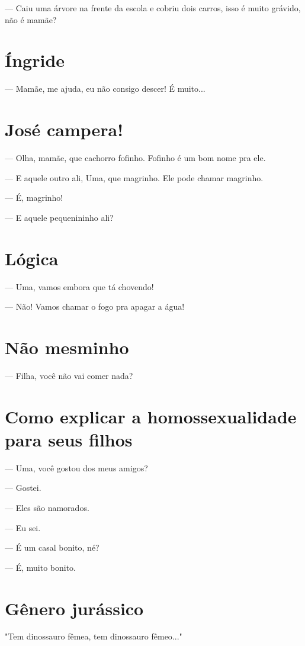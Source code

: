 — Caiu uma árvore na frente da escola e cobriu dois carros, isso é muito
grávido, não é mamãe?

\chapter{Íngride}

— Mamãe, me ajuda, eu não consigo descer! É muito...

\chapter{José campera!}

— Olha, mamãe, que cachorro fofinho. Fofinho é um bom nome pra ele.

— E aquele outro ali, Uma, que magrinho. Ele pode chamar magrinho.

— É, magrinho!

— E aquele pequenininho ali?

\chapter{Lógica}

— Uma, vamos embora que tá chovendo!

— Não! Vamos chamar o fogo pra apagar a água!

\chapter{Não mesminho}

— Filha, você não vai comer nada?

\chapter{Como explicar a homossexualidade para seus filhos}

— Uma, você gostou dos meus amigos?

— Gostei.

— Eles são namorados.

— Eu sei.

— É um casal bonito, né?

— É, muito bonito.

\chapter{Gênero jurássico}

"Tem dinossauro fêmea, tem dinossauro fêmeo..."

